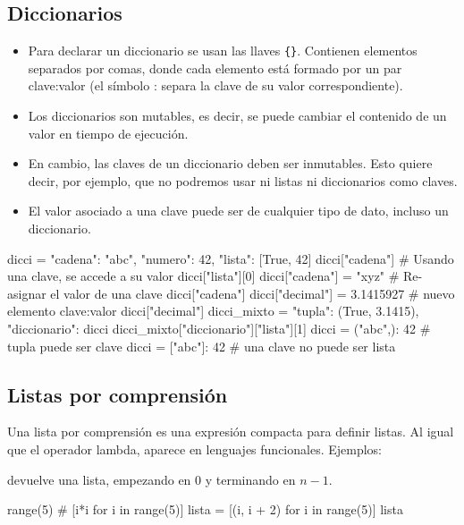 \subsection{Diccionarios}
\begin{itemize}
\item    Para declarar un diccionario se usan las llaves \verb~{}~. Contienen elementos separados por comas, donde cada elemento está formado por un par clave:valor (el símbolo : separa la clave de su valor correspondiente).
 \item   Los diccionarios son mutables, es decir, se puede cambiar el contenido de un valor en tiempo de ejecución.
\item    En cambio, las claves de un diccionario deben ser inmutables. Esto quiere decir, por ejemplo, que no podremos usar ni listas ni diccionarios como claves.
\item    El valor asociado a una clave puede ser de cualquier tipo de dato, incluso un diccionario.

\end{itemize}






\begin{pyconsole}
dicci = {"cadena": "abc", "numero": 42, "lista": [True, 42]}
dicci["cadena"] # Usando una clave, se accede a su valor
dicci["lista"][0]
dicci["cadena"] = "xyz" # Re-asignar el valor de una clave
dicci["cadena"]
dicci["decimal"] = 3.1415927 # nuevo elemento clave:valor
dicci["decimal"]
dicci_mixto = {"tupla": (True, 3.1415), "diccionario": dicci}
dicci_mixto["diccionario"]["lista"][1]
dicci = {("abc",): 42} # tupla puede ser clave 
dicci = {["abc"]: 42} # una clave no puede ser lista
\end{pyconsole}



\subsection{Listas por comprensión}
Una lista por comprensión es una expresión compacta para definir listas. Al igual que el operador lambda, aparece en lenguajes funcionales. Ejemplos:

 devuelve una lista, empezando en 0 y terminando en $n-1$.

\begin{pyconsole}
range(5) #  
[i*i for i in range(5)]
lista = [(i, i + 2) for i in range(5)]
lista
\end{pyconsole}



